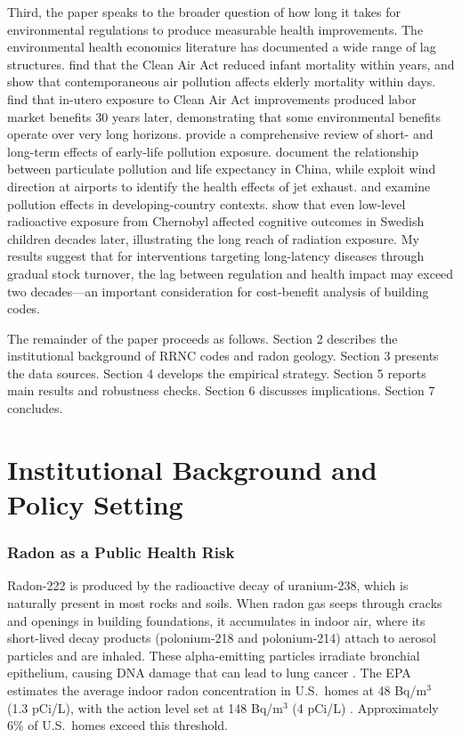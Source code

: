 \documentclass[12pt]{article}
\begin{document}
Third, the paper speaks to the broader question of how long it takes for environmental regulations to produce measurable health improvements. The environmental health economics literature has documented a wide range of lag structures. \citet{chay2003impact} find that the Clean Air Act reduced infant mortality within years, and \citet{deryugina2019mortality} show that contemporaneous air pollution affects elderly mortality within days. \citet{isen2017every} find that in-utero exposure to Clean Air Act improvements produced labor market benefits 30 years later, demonstrating that some environmental benefits operate over very long horizons. \citet{currie2014environmental} provide a comprehensive review of short- and long-term effects of early-life pollution exposure. \citet{ebenstein2017growth} document the relationship between particulate pollution and life expectancy in China, while \citet{schlenker2016airports} exploit wind direction at airports to identify the health effects of jet exhaust. \citet{hanna2012effect} and \citet{arceo2016does} examine pollution effects in developing-country contexts. \citet{almond2009chernobyl} show that even low-level radioactive exposure from Chernobyl affected cognitive outcomes in Swedish children decades later, illustrating the long reach of radiation exposure. My results suggest that for interventions targeting long-latency diseases through gradual stock turnover, the lag between regulation and health impact may exceed two decades---an important consideration for cost-benefit analysis of building codes.

The remainder of the paper proceeds as follows. Section 2 describes the institutional background of RRNC codes and radon geology. Section 3 presents the data sources. Section 4 develops the empirical strategy. Section 5 reports main results and robustness checks. Section 6 discusses implications. Section 7 concludes.


\section{Institutional Background and Policy Setting}

\subsubsection*{Radon as a Public Health Risk} Radon-222 is produced by the radioactive decay of uranium-238, which is naturally present in most rocks and soils. When radon gas seeps through cracks and openings in building foundations, it accumulates in indoor air, where its short-lived decay products (polonium-218 and polonium-214) attach to aerosol particles and are inhaled. These alpha-emitting particles irradiate bronchial epithelium, causing DNA damage that can lead to lung cancer \citep{national1999health}. The EPA estimates the average indoor radon concentration in U.S.\ homes at 48 Bq/m$^3$ (1.3 pCi/L), with the action level set at 148 Bq/m$^3$ (4 pCi/L) \citep{epa2003assessment}. Approximately 6\% of U.S.\ homes exceed this threshold.
\end{document}
